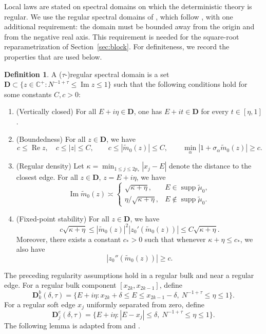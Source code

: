 \documentclass[11pt,reqno]{amsart}
\def\C{\mathbb{C}}
\def\bD{\mathbf{D}}
\def\Im{\operatorname{Im}}
\def\Re{\operatorname{Re}}
\def\supp{\operatorname{supp}}
\theoremstyle{definition}
\newtheorem{defi}[theorem]{Definition}
\numberwithin{equation}{section}
\numberwithin{figure}{section}
\begin{document}
Local laws are stated on spectral domains on which the deterministic theory is regular. We use the regular spectral domains of \cite[Definition~2.3]{fan2026anisotropic}, which follow \cite{knowles2017anisotropic}, with one additional requirement: the domain must be bounded away from the origin and from the negative real axis. This requirement is needed for the square-root reparametrization of Section~\ref{sec:block}. For definiteness, we record the properties that are used below.


\begin{defi}
A ($\tau$-)regular spectral domain is a set $\bD\subset\{z\in\C^+:N^{-1+\tau}\leq\Im z\le1\}$ such that the following conditions hold for some constants $C,c>0$:
\begin{enumerate}[label=(\alph*)]
    \item (Vertically closed) For all $E+i\eta\in\bD$, one has $E+it\in\bD$ for every $t\in[\eta,1]$.
    \item (Boundedness) For all $z\in\bD$, we have
    \begin{equation}\label{eq:regular-basic}
    c\leq \Re z,\quad 
    c\le |z|\le C,\qquad
    c\le|\widetilde m_0(z)|\le C,\qquad
    \min_\alpha|1+\sigma_\alpha\widetilde m_0(z)|\ge c.
    \end{equation}
    \item (Regular density) Let $\kappa=\min_{1\le j\le2p_*}|x_j-E|$ denote the distance to the closest edge. For all $z\in\bD$, $z = E + i \eta$, we have
    \begin{equation}\label{eq:regular-density}
    \Im \widetilde m_0(z) \asymp
    \begin{cases}
    \sqrt{\kappa+\eta},
     &E\in\supp  \widetilde\mu_0,\\[2pt]
    \eta/\sqrt{\kappa+\eta},
     &E\notin\supp  \widetilde\mu_0.
    \end{cases}
    \end{equation}
    \item (Fixed-point stability) For all $z\in\bD$, we have
    \[
        c\sqrt{\kappa+\eta}\leq|\widetilde m_0(z)|^2|z_0'(\widetilde m_0(z))|\leq C\sqrt{\kappa+\eta}.
    \]
    Moreover, there exists a constant $c_*>0$ such that whenever $\kappa + \eta \leq c_*$, we also have
    \[
        |z_0''(\widetilde m_0(z))|\geq c.
    \]
\end{enumerate}
\end{defi}

The preceding regularity assumptions hold in a regular bulk and near a regular edge. For a regular bulk component $[x_{2k},x_{2k-1}]$, define
\[
    \bD_k^b(\delta,\tau) = \{ E + i \eta : x_{2k} + \delta \leq E \leq x_{2k-1}- \delta, \ N^{-1 + \tau} \leq \eta \leq 1 \}.
\]
For a regular soft edge $x_j$ uniformly separated from zero, define
\[
    \bD_j^e(\delta,\tau) = \{ E + i \eta : |E - x_j| \leq \delta, \ N^{-1 + \tau} \leq \eta \leq 1 \}.
\]
The following lemma is adapted from \cite{knowles2017anisotropic} and \cite[Lemma 2.4]{fan2026anisotropic}.
\end{document}
